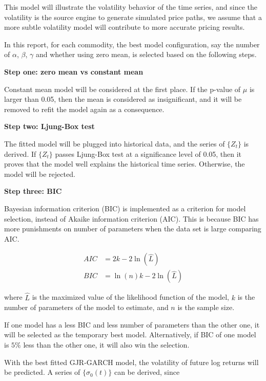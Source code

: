 \documentclass[10pt, a4paper, twocolumn]{article} %
\begin{document}
This model will illustrate the volatility behavior of the time series, and since the volatility is the source engine to generate simulated price paths, we assume that a more subtle volatility model will contribute to more accurate pricing results.

In this report, for each commodity, the best model configuration, say the number of $\alpha$, $\beta$, $\gamma$ and whether using zero mean, is selected based on the following steps.

\textbf{Step one: zero mean vs constant mean}

Constant mean model will be considered at the first place. If the p-value of $\mu$ is larger than 0.05, then the mean is considered as insignificant, and it will be removed to refit the model again as a consequence.

\textbf {Step two: Ljung-Box test}

The fitted model will be plugged into historical data, and the series of $\{ Z_t\}$ is derived. If $\{ Z_t\}$ passes Ljung-Box test at a significance level of 0.05, then it proves that the model well explains the historical time series. Otherwise, the model will be rejected.

\textbf {Step three: BIC}

Bayesian information criterion (BIC) is implemented as a criterion for model selection, instead of Akaike information criterion (AIC). This is because BIC has more punishments on number of parameters when the data set is large comparing AIC. 

\begin{equation}
\begin{aligned}
AIC &= 2k - 2\ln (\hat L)
\\
BIC &= \ln(n) k - 2\ln (\hat L)
\end{aligned}
\end{equation}

where $\hat L$ is the maximized value of the likelihood function of the model, $k$ is the number of parameters of the model to estimate, and $n$ is the sample size.

If one model has a less BIC and less number of parameters than the other one, it will be selected as the temporary best model. Alternatively, if BIC of one model is $5\%$ less than the other one, it will also win the selection.

With the best fitted GJR-GARCH model, the volatility of future log returns will be predicted. A series of $\{ \sigma_0(t)\}$ can be derived, since
\end{document}
